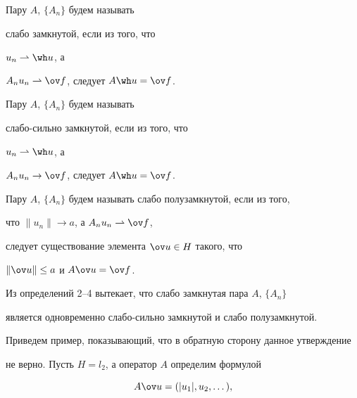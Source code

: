  


\begin{defn} Пару $A$, $\{A_n\}$ будем называть 


слабо замкнутой, если из того, что 


$u_n\rightharpoonup\wh u$, а 


$A_nu_n\rightharpoonup\ov f$, следует $A\wh u=\ov f$. 


\end{defn} 


 


\begin{defn} Пару $A$, $\{A_n\}$ будем называть 


слабо-сильно замкнутой, если из того, что 


$u_n\rightharpoonup\wh u$, а 


$A_nu_n\to\ov f$, следует $A\wh u=\ov f$. 


\end{defn} 


 


\begin{defn} 


Пару $A$, $\{A_n\}$ будем называть слабо полузамкнутой, если из того, 


что $\|u_n\|\to a$, а $A_nu_n\rightharpoonup\ov f$, 


следует существование элемента $\ov u\in H$ такого, что 


$\|\ov u\|\le a$ и $A\ov u=\ov f$. 


\end{defn} 


 


Из определений 2--4 вытекает, что слабо замкнутая пара $A$, $\{A_n\}$ 


является одновременно слабо-сильно замкнутой и слабо полузамкнутой. 


 


Приведем пример, показывающий, что в обратную сторону данное утверждение 


не верно. Пусть $H=l_2$, а оператор $A$ определим формулой 


\begin{equation} 


A\ov u=(|u_1|,u_2,\dotsc), 


\end{equation} 


